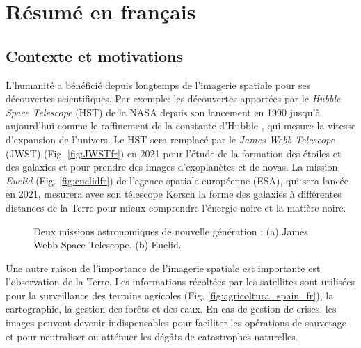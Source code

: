 \setcounter{chapter}{18}%
\renewcommand{\thechapter}{\Alph{chapter}}%

\chapter*{R\'esum\'e en fran\c{c}ais}

\minitoc

\section{Contexte et motivations}

L'humanit\'e a b\'en\'efici\'e depuis longtemps de l'imagerie spatiale pour ses d\'ecouvertes scientifiques. Par exemple: les d\'ecouvertes apport\'ees par le \textit{Hubble Space Telescope} (HST) de la NASA depuis son lancement en 1990 jusqu'\`a aujourd'hui comme le raffinement de la constante d'Hubble \cite{FBM01}, qui mesure la vitesse d'expansion de l'univers. Le HST sera remplac\'e par le \textit{James Webb Telescope} (JWST) (Fig. \ref{fig:JWSTfr}) en 2021 pour l'\'etude de la formation des \'etoiles et des galaxies et pour prendre des images d'exoplan\`etes et de novas. La mission \textit{Euclid} (Fig. \ref{fig:euclidfr}) de l'agence spatiale europ\'eenne (ESA), qui sera lanc\'ee en 2021, mesurera avec son t\'elescope Korsch \cite{K77} la forme des galaxies \`a diff\'erentes distances de la Terre pour mieux comprendre l'\'energie noire et la mati\`ere noire. 

\begin{figure}[!h]%
    \centering
    \qquad
    \caption{Deux missions astronomiques de nouvelle g\'en\'eration : (a) James Webb Space Telescope. (b) Euclid.}%
\end{figure}
 
Une autre raison de l'importance de l'imagerie spatiale est importante est l'observation de la Terre. Les informations r\'ecolt\'ees par les satellites sont utilis\'ees pour la surveillance des terrains agricoles (Fig. \ref{fig:agricoltura_spain_fr}), la cartographie, la gestion des for\^ets et des eaux. En cas de gestion de crises, les images peuvent devenir indispensables pour faciliter les op\'erations de sauvetage et pour neutraliser ou att\'enuer les d\'eg\^ats de catastrophes naturelles.

